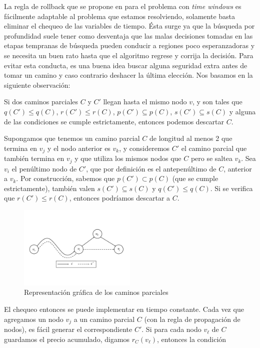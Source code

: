 La regla de rollback que se propone en \cite{lozano-duque-medaglia} para el problema con \emph{time windows} es fácilmente adaptable al problema que estamos resolviendo, solamente basta eliminar el chequeo de las variables de tiempo. Ésta surge ya que la búsqueda por profundidad suele tener como desventaja que las malas decisiones tomadas en las etapas tempranas de búsqueda pueden conducir a regiones poco esperanzadoras y se necesita un buen rato hasta que el algoritmo regrese y corrija la decisión. Para evitar esta conducta, es una buena idea buscar alguna seguridad extra antes de tomar un camino y caso contrario deshacer la última elección. Nos basamos en la siguiente observación:

\begin{observation}
    Si dos caminos parciales $C$ y $C'$ llegan hasta el mismo nodo $v$, y son tales que $q(C') \leq q(C)$, $r(C') \leq r(C)$, $p(C') \subseteq p(C)$, $s(C') \subseteq s(C)$ y alguna de las condiciones se cumple estrictamente, entonces podemos descartar $C$.
\end{observation}

Supongamos que tenemos un camino parcial $C$ de longitud al menos 2 que termina en $v_j$ y el nodo anterior es $v_k$, y consideremos $C'$ el camino parcial que también termina en $v_j$ y que utiliza los mismos nodos que $C$ pero se saltea $v_k$. Sea $v_i$ el penúltimo nodo de $C'$, que por definición es el antepenúltimo de $C$, anterior a $v_k$. Por construcción, sabemos que $p(C') \subset p(C)$ (que se cumple estrictamente), también valen $s(C') \subseteq s(C)$ y $q(C') \leq q(C)$. Si se verifica que $r(C') \leq r(C)$, entonces podríamos descartar a $C$.

\begin{figure}[H]
\centering
\includegraphics[width=0.5\textwidth]{img/rollback_pruning.jpg}
\caption{Representación gráfica de los caminos parciales}
\label{fig:rollback-pruning}
\centering
\end{figure}

El chequeo entonces se puede implementar en tiempo constante. Cada vez que agregamos un nodo $v_j$ a un camino parcial $C$ (con la regla de propagación de nodos), es fácil generar el correspondiente $C'$. Si para cada nodo $v_{\ell}$ de $C$ guardamos el precio acumulado, digamos $r_C(v_{\ell})$, entonces la condición

